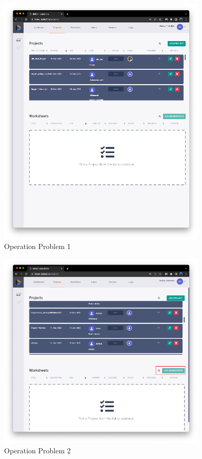 \documentclass[conference,onecolumn]{IEEEtran}
\begin{document}
    \begin{figure}[H]
        \centerline{\includegraphics[width=100mm,scale=1]{./images/Operation_Problem_1.png}}
        \caption{Operation Problem 1}
        \label{Operation Problem 1}
    \end{figure}  
    \begin{figure}[H]
        \centerline{\includegraphics[width=100mm,scale=1]{./images/Operation_Problem_2.png}}
        \caption{Operation Problem 2}
        \label{Operation Problem 2}
    \end{figure}  
\end{document}
